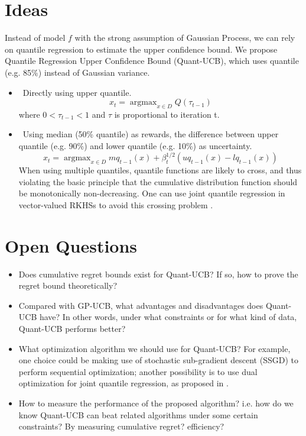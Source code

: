 \documentclass[a0,portrait]{a0poster}
\DeclareMathOperator*{\argmax}{argmax}
\newcommand{\textmoveup}{\vspace{-.5cm}}
\begin{document}
\begin{multicols}{2}
\section{Ideas}
\vspace{-.6cm}

Instead of model $f$ with the strong assumption of Gaussian Process, we can rely on quantile regression to estimate the upper confidence bound. We propose Quantile Regression Upper Confidence Bound (Quant-UCB), which uses quantile (e.g. 85\%) instead of Gaussian variance. \\
 
\begin{itemize}
\item \ Directly using upper quantile. 
    $$x_t = \argmax_{x \in D} Q(\tau_{t-1})$$
    where $0 < \tau_{t-1} < 1$ and $\tau$ is proportional to iteration t.
\item \ Using median (50\% quantile) as rewards, the difference between upper quantile (e.g. 90\%) and lower quantile (e.g. 10\%) as uncertainty. 
$$x_t = \argmax_{x \in D} mq_{t-1} (x) + \beta_t^{1/2} (uq_{t-1} (x) - lq_{t-1}(x))$$
When using multiple quantiles, quantile functions are likely to cross, and thus violating the basic principle that the cumulative distribution function should be monotonically non-decreasing. One can use joint quantile regression in vector-valued RKHSs to avoid this crossing problem \cite{Sangnier:2016:JQR:3157382.3157511}. 
\end{itemize}

\section{Open Questions}
\textmoveup

\begin{itemize}
    \item Does cumulative regret bounds exist for Quant-UCB? If so, how to prove the regret bound theoretically? 
    \item Compared with GP-UCB, what advantages and disadvantages does Quant-UCB have? In other words, under what constraints or for what kind of data, Quant-UCB performs better?
    \item What optimization algorithm we should use for Quant-UCB? For example, one choice could be making use of stochastic sub-gradient descent (SSGD) to perform sequential optimization; another possibility is to use dual optimization for joint quantile regression, as proposed in \cite{Sangnier:2016:JQR:3157382.3157511}.
    \item How to measure the performance of the proposed algorithm? i.e. how do we know Quant-UCB can beat related algorithms under some certain constraints? By measuring cumulative regret? efficiency? 
\end{itemize}


\end{multicols}
\end{document}
